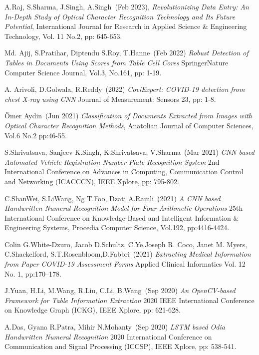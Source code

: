 \begin{thebibliography}{999}

A.Raj, S.Sharma, J.Singh, A.Singh~(Feb 2023), 
{\it Revolutionizing Data Entry: An In-Depth Study of Optical Character Recognition Technology and Its Future Potential}, 
International Journal for Research in Applied Science \& Engineering Technology, Vol. 11 No.2, pp: 645-653.

Md. Ajij, S.Pratihar, Diptendu S.Roy, T.Hanne~(Feb 2022)
{\it Robust Detection of Tables in Documents Using Scores from Table Cell Cores}
SpringerNature Computer Science Journal, Vol.3, No.161, pp: 1-19.

A. Arivoli, D.Golwala, R.Reddy~(2022)
{\it CoviExpert: COVID-19 detection from chest X-ray using CNN} 
Journal of Measurement: Sensors 23, pp: 1-8.

Ömer Aydin~(Jun 2021) 
{\it Classification of Documents Extracted from Images with Optical Character Recognition Methods}, 
Anatolian Journal of Computer Sciences, Vol.6 No.2 pp:46-55.

S.Shrivatsava, Sanjeev K.Singh, K.Shrivatsava, V.Sharma~(Mar 2021)
{\it CNN based Automated Vehicle Registration Number Plate Recognition System} 
2nd International Conference on Advances in Computing, Communication Control and Networking (ICACCCN), IEEE Xplore, pp: 795-802.

C.ShanWei, S.LiWang, Ng T.Foo, Dzati A.Ramli~(2021)
{\it A CNN based Handwritten Numeral Recognition Model for Four Arithmetic Operations}
25th International Conference on Knowledge-Based and Intelligent Information \& Engineering
Systems, Procedia Computer Science, Vol.192, pp:4416-4424.

\clearpage

Colin G.White-Dzuro, Jacob D.Schultz, C.Ye,Joseph R. Coco, Janet M. Myers, C.Shackelford, S.T.Rosenbloom,D.Fabbri~(2021)
{\it Extracting Medical Information from Paper COVID-19 Assessment Forms} 
Applied Clinical Informatics Vol. 12 No. 1, pp:170–178.

J.Yuan, H.Li, M.Wang, R.Liu, C.Li, B.Wang~(Sep 2020)
{\it An OpenCV-based Framework for Table Information Extraction}
2020 IEEE International Conference on Knowledge Graph (ICKG), IEEE Xplore, pp: 621-628.

A.Das, Gyana R.Patra, Mihir N.Mohanty~(Sep 2020)
{\it LSTM based Odia Handwritten Numeral Recognition} 
2020 International Conference on Communication and Signal Processing (ICCSP), IEEE Xplore, pp: 538-541.


\end{thebibliography}
